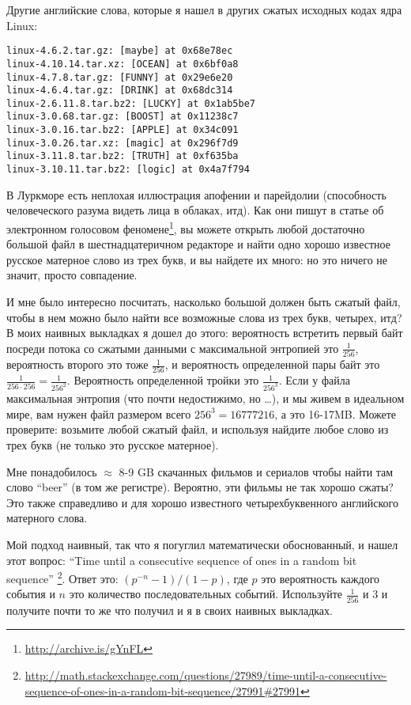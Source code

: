 Другие английские слова, которые я нашел в других сжатых исходных кодах ядра Linux:

\begin{lstlisting}
linux-4.6.2.tar.gz: [maybe] at 0x68e78ec
linux-4.10.14.tar.xz: [OCEAN] at 0x6bf0a8
linux-4.7.8.tar.gz: [FUNNY] at 0x29e6e20
linux-4.6.4.tar.gz: [DRINK] at 0x68dc314
linux-2.6.11.8.tar.bz2: [LUCKY] at 0x1ab5be7
linux-3.0.68.tar.gz: [BOOST] at 0x11238c7
linux-3.0.16.tar.bz2: [APPLE] at 0x34c091
linux-3.0.26.tar.xz: [magic] at 0x296f7d9
linux-3.11.8.tar.bz2: [TRUTH] at 0xf635ba
linux-3.10.11.tar.bz2: [logic] at 0x4a7f794
\end{lstlisting}

В Луркморе есть неплохая иллюстрация апофении и парейдолии (способность человеческого разума видеть лица в облаках, итд).
Как они пишут в статье об электронном голосовом феномене\footnote{\url{http://archive.is/gYnFL}},
вы можете открыть любой достаточно большой файл в шестнадцатеричном редакторе и найти одно хорошо известное русское матерное слово из трех букв, и вы найдете их много: но это ничего не значит, просто совпадение.

И мне было интересно посчитать, насколько большой должен быть сжатый файл, чтобы в нем можно было найти все возможные слова из трех букв, четырех, итд?
В моих наивных выкладках я дошел до этого: вероятность встретить первый байт посреди потока со сжатыми данными с максимальной энтропией это 
$\frac{1}{256}$, вероятность второго это тоже $\frac{1}{256}$,
и вероятность определенной пары байт это $\frac{1}{256 \cdot 256} = \frac{1}{256^2}$.
Вероятность определенной тройки это $\frac{1}{256^3}$.
Если у файла максимальная энтропия (что почти недостижимо, но \dots), и мы живем в идеальном мире, вам нужен файл размером всего $256^3=16777216$, а это 16-17MB.
Можете проверите: возьмите любой сжатый файл, и используя  найдите любое слово из трех букв (не только это русское матерное).

Мне понадобилось $\approx$ 8-9 GB скачанных фильмов и сериалов чтобы найти там слово ``beer'' (в том же регистре).
Вероятно, эти фильмы не так хорошо сжаты?
Это также справедливо и для хорошо известного четырехбуквенного английского матерного слова.

Мой подход наивный, так что я погуглил математически обоснованный, и нашел этот вопрос:
``Time until a consecutive sequence of ones in a random bit sequence''
\footnote{\url{http://math.stackexchange.com/questions/27989/time-until-a-consecutive-sequence-of-ones-in-a-random-bit-sequence/27991#27991}}.
Ответ это: $(p^{−n}−1)/(1−p)$, где $p$ это вероятность каждого события и $n$ это количество последовательных событий.
Используйте $\frac{1}{256}$ и $3$ и получите почти то же что получил и я в своих наивных выкладках.

